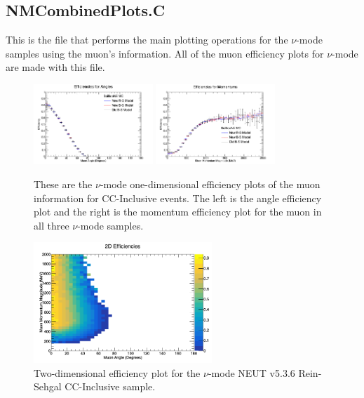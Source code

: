 \documentclass[11pt]{article}
\begin{document}
\subsection{NMCombinedPlots.C}
\label{sub:NMCombinedPlots.C}
This is the file that performs the main plotting operations for the $\nu$-mode samples using the muon's information. All of the muon efficiency plots for $\nu$-mode are made with this file.

\begin{figure}[H]
\centering
\includegraphics[width=0.4\textwidth]{NMCombinedPlotsImages/22-NMCombinedPlots.png}
\includegraphics[width=0.4\textwidth]{NMCombinedPlotsImages/23-NMCombinedPlots.png}
\caption{These are the $\nu$-mode one-dimensional efficiency plots of the muon information for CC-Inclusive events. The left is the angle efficiency plot and the right is the momentum efficiency plot for the muon in all three $\nu$-mode samples.}
\label{fig:app:NMCCInclusive1DEff}
\end{figure}

\begin{figure}[H]
\centering
\includegraphics[width=0.6\textwidth]{CCInclusivePlots/2DEffCompareNMRS.png}
\caption{Two-dimensional efficiency plot for the $\nu$-mode NEUT v5.3.6 Rein-Sehgal CC-Inclusive sample.}
\label{fig:app:NMCCInclusiveMuon2DEffRS}
\end{figure}
\end{document}
